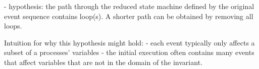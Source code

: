 - hypothesis: the path through the reduced state machine defined by the original event sequence contains loop(s). A shorter path can be obtained by removing all loops.

Intuition for why this hypothesis might hold:
 - each event typically only affects a subset of a processes' variables
 - the initial execution often contains many events that affect variables that are not in the domain of the invariant.
